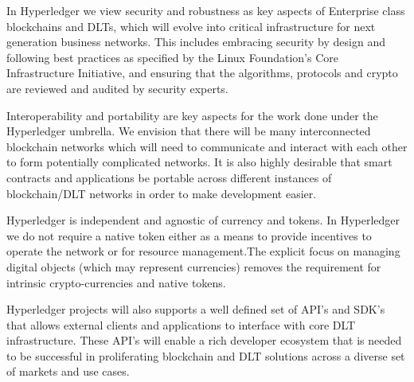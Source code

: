 In Hyperledger we view security and robustness as key aspects of Enterprise class blockchains and DLTs, which will evolve into critical infrastructure for next generation business networks. This includes embracing security by design and following best practices as specified by the Linux Foundation’s Core Infrastructure Initiative, and ensuring that the algorithms, protocols and crypto are reviewed and audited by security experts.

Interoperability and portability are key aspects for the work done under the Hyperledger umbrella. We envision that there will be many interconnected blockchain networks which will need to communicate and interact with each other to form potentially complicated networks. It is also highly desirable that smart contracts and applications be portable across different instances of blockchain/DLT networks in order to make development easier.

Hyperledger is independent and agnostic of currency and tokens. In Hyperledger we do not require a native token either as a means to provide incentives to operate the network or for resource management.The explicit focus on managing digital objects (which may represent currencies) removes the requirement for intrinsic crypto-currencies and native tokens. 

Hyperledger projects will also supports a well defined set of API’s and SDK’s that allows external  clients and applications to interface with core DLT infrastructure. These API’s will enable a rich developer ecosystem that is needed to be successful in proliferating blockchain and DLT solutions across a diverse set of markets and use cases.
